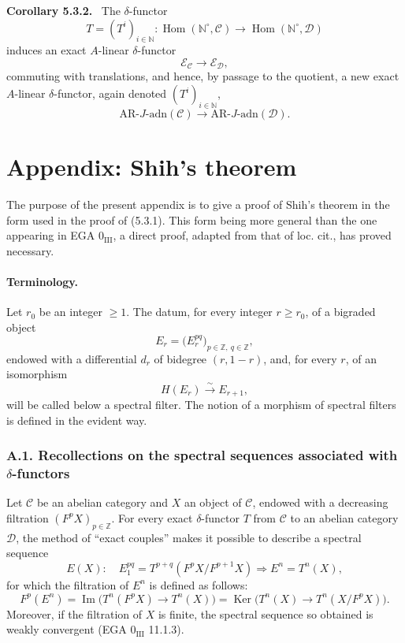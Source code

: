 \documentclass[11pt]{article}
\newenvironment{statement}[1]{\par\medskip\noindent\textbf{#1.}\ }{\par\medskip}
\DeclareMathOperator{\Hom}{Hom}
\providecommand{\Ker}{\operatorname{Ker}}
\providecommand{\Hom}{\operatorname{Hom}}
\providecommand{\Im}{\operatorname{Im}}
\providecommand{\Ker}{\operatorname{Ker}}
\renewcommand{\Im}{\operatorname{Im}}
\providecommand{\Ker}{\operatorname{Ker}}
\providecommand{\Im}{\operatorname{Im}}
\begin{document}
\begin{statement}{Corollary 5.3.2}
The \(\delta\)-functor
\[
T=(T^i)_{i\in\mathbb N}:\Hom(\mathbb N^\circ,\mathcal C)\longrightarrow\Hom(\mathbb N^\circ,\mathcal D)
\]
induces an exact \(A\)-linear \(\delta\)-functor
\[
\mathcal E_{\mathcal C}\longrightarrow\mathcal E_{\mathcal D},
\]
commuting with translations, and hence, by passage to the quotient, a new exact \(A\)-linear \(\delta\)-functor, again denoted \((T^i)_{i\in\mathbb N}\),
\[
\mathrm{AR}\text{-}J\text{-adn}(\mathcal C)\longrightarrow
\mathrm{AR}\text{-}J\text{-adn}(\mathcal D).
\]
\end{statement}

\section*{Appendix: Shih's theorem}

The purpose of the present appendix is to give a proof of Shih's theorem in the form used in the proof of (5.3.1). This form being more general than the one appearing in EGA \(0_{\mathrm{III}}\), a direct proof, adapted from that of loc. cit., has proved necessary.

\paragraph{Terminology.}
Let \(r_0\) be an integer \(\ge1\). The datum, for every integer \(r\ge r_0\), of a bigraded object
\[
E_r=\bigl(E_r^{pq}\bigr)_{p\in\mathbb Z,\ q\in\mathbb Z},
\]
endowed with a differential \(d_r\) of bidegree \((r,1-r)\), and, for every \(r\), of an isomorphism
\[
H(E_r)\xrightarrow{\sim}E_{r+1},
\]
will be called below a spectral filter. The notion of a morphism of spectral filters is defined in the evident way.

\subsubsection*{A.1. Recollections on the spectral sequences associated with \(\delta\)-functors}

Let \(\mathcal C\) be an abelian category and \(X\) an object of \(\mathcal C\), endowed with a decreasing filtration \((F^pX)_{p\in\mathbb Z}\). For every exact \(\delta\)-functor \(T\) from \(\mathcal C\) to an abelian category \(\mathcal D\), the method of “exact couples” makes it possible to describe a spectral sequence
\[
E(X):\quad E_1^{pq}=T^{p+q}(F^pX/F^{p+1}X)\Rightarrow E^n=T^n(X),
\]
for which the filtration of \(E^n\) is defined as follows:
\[
F^p(E^n)=\Im\bigl(T^n(F^pX)\longrightarrow T^n(X)\bigr)
=\Ker\bigl(T^n(X)\longrightarrow T^n(X/F^pX)\bigr).
\]
Moreover, if the filtration of \(X\) is finite, the spectral sequence so obtained is weakly convergent (EGA \(0_{\mathrm{III}}\) 11.1.3).
\end{document}
